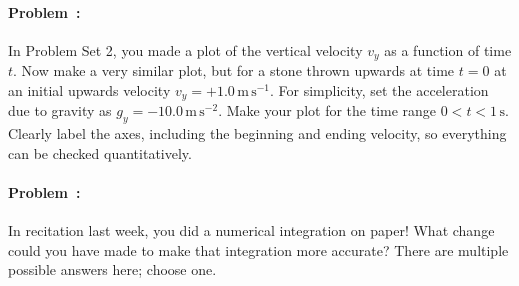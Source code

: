 \documentclass[12pt]{article}
\newcounter{problem}
\newcommand{\m}{\mathrm{m}}
\newcommand{\s}{\mathrm{s}}
\begin{document}
\vfill

\paragraph{Problem~\theproblem:}%
In Problem Set 2, you made a plot of the vertical velocity $v_y$ as a
function of time $t$. Now make a very similar plot, but for a stone
thrown upwards at time $t=0$ at an initial upwards velocity
$v_y=+1.0\,\m\,\s^{-1}$. For simplicity, set the acceleration due to
gravity as $g_y=-10.0\,\m\,\s^{-2}$. Make your plot for the time range
$0<t<1\,\s$. Clearly label the axes, including the beginning and
ending velocity, so everything can be checked quantitatively.

\vfill

\paragraph{Problem~\theproblem:}%
In recitation last week, you did a numerical integration on
paper! What change could you have made to make that integration more
accurate? There are multiple possible answers here; choose one.

\vfill
~
\end{document}
